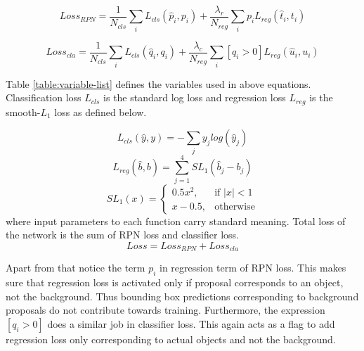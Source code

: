 $$Loss_{RPN}= \frac{1}{N_{cls}}\sum_i L_{cls}(\hat{p}_i,p_i) + \frac{\lambda_r}{N_{reg}}\sum_i p_i L_{reg}(\hat{t}_i,t_i)$$

\begin{small}
$$Loss_{cla} = \frac{1}{N_{cls}}\sum_i L_{cls}(\hat{q}_i,q_i) + \frac{\lambda_c}{N_{reg}}\sum_i [q_i > 0] L_{reg}(\hat{u}_i,u_i)$$
\end{small}
Table \ref{table:variable-list} defines the variables used in above equations. Classification loss $L_{cls}$ is the standard log loss and regression loss $L_{reg}$ is the smooth-$L_1$ loss as defined below. 

$$ L_{cls}(\hat{y},y) = -\sum_j y_jlog(\hat{y}_j) $$
$$ L_{reg}(\hat{b},b) = \sum_{j=1}^4 SL_1(\hat{b}_j - b_j) $$
$$SL_1(x) = \begin{cases}
0.5x^2, & \text{if } |x|<1 \\
x-0.5,  & \text{otherwise}
\end{cases}
$$
where input parameters to each function carry standard meaning. Total loss of the network is the sum of RPN loss and classifier loss.
$$ Loss = Loss_{RPN} + Loss_{cla} $$

Apart from that notice the term $p_i$ in regression term of RPN loss. This makes sure that regression loss is activated only if proposal corresponds to an object, not the background.  Thus bounding box predictions corresponding to background proposals do not contribute towards training. Furthermore, the expression $[q_i>0]$ does a similar job in classifier loss. This again acts as a flag to add regression loss only corresponding to actual objects and not the background. 

